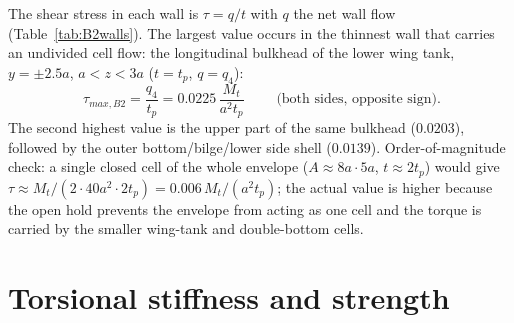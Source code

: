 \bigskip
The shear stress in each wall is $\tau=q/t$ with $q$ the net wall flow (Table~\ref{tab:B2walls}). The largest value occurs in the thinnest wall that carries an undivided cell flow: the longitudinal bulkhead of the lower wing tank, $y=\pm2.5a$, $a<z<3a$ ($t=t_p$, $q=q_4$):
\begin{equation}
  \boxed{\;\tau_{max,B2}=\frac{q_4}{t_p}=0.0225\,\frac{M_t}{a^2t_p}\;}\qquad\text{(both sides, opposite sign)}.
\end{equation}
The second highest value is the upper part of the same bulkhead ($0.0203$), followed by the outer bottom/bilge/lower side shell ($0.0139$). Order-of-magnitude check: a single closed cell of the whole envelope ($A\approx8a\cdot5a$, $t\approx2t_p$) would give $\tau\approx M_t/(2\cdot40a^2\cdot2t_p)=0.006\,M_t/(a^2t_p)$; the actual value is higher because the open hold prevents the envelope from acting as one cell and the torque is carried by the smaller wing-tank and double-bottom cells.

\section{Torsional stiffness and strength}

